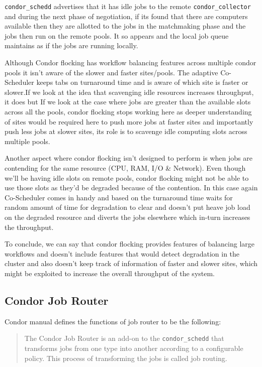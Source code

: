 \documentclass[ms,electronic,double]{nuthesis}
\begin{document}
\texttt{condor\_schedd} advertises that it has idle jobs to the remote \texttt{condor\_collector} 
and during the next phase of negotiation, if its found that there are computers 
available then they are allotted to the jobs in the matchmaking phase and the 
jobs then run on the remote pools. It so appears and the local job queue maintains as if 
the jobs are running locally. 

Although Condor flocking has workflow balancing features across multiple condor 
pools it isn't aware of the slower and faster sites/pools. The adaptive Co-Scheduler 
keeps tabs on turnaround time and is aware of which site is faster or slower.If we 
look at the idea that scavenging idle resources increases throughput, it does 
but If we look at the case where jobs are greater than the available slots 
across all the pools, condor flocking stops working here as deeper understanding of sites
would be required here to push more jobs at faster sites and importantly push less jobs
at slower sites, its role is to scavenge idle computing slots across multiple pools. 

Another aspect where condor flocking isn't designed to perform is when jobs are 
contending for the same resource (CPU, RAM, I/O \& Network). Even though we'll be 
having idle slots on remote pools, condor flocking might not be able to use those 
slots as they'd be degraded because of the contention. In this case again 
Co-Scheduler comes in handy and based on the turnaround time waits for random 
amount of time for degradation to clear and doesn't put heave job load on the 
degraded resource and diverts the jobs elsewhere which in-turn increases the 
throughput.

To conclude, we can say that condor flocking provides features of balancing 
large workflows and doesn't include features that would detect degradation in 
the cluster and also doesn't keep track of information of faster and 
slower sites, which might be exploited to increase the overall throughput of the system. 

\subsection{Condor Job Router}

Condor manual defines the functions of job router to be the following:
\begin{quotation}

The Condor Job Router is an add-on to the \texttt{condor\_schedd} that transforms jobs from one type into 
another according to a configurable policy. 
This process of transforming the jobs is called job routing.
\end{quotation}
\end{document}
